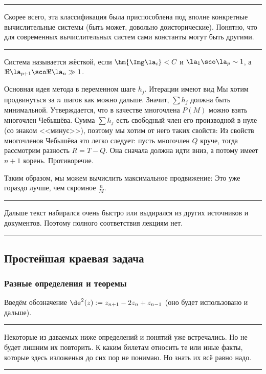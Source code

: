 \documentclass[a4paper]{article}
\newenvironment{petit}{\medskip\hrule\smallskip\footnotesize}{\par\smallskip\hrule\medskip}
\begin{document}
\begin{petit}
Скорее всего, эта классификация была приспособлена под вполне конкретные вычислительные системы (быть может,
довольно доисторические). Понятно, что для современных вычислительных систем сами константы могут быть другими.
\end{petit}

\begin{df}
Система называется жёсткой, если $\hm{\Img \la_i} < C$ и $\la_1\sco\la_p \sim 1$, а $\Re \la_{p+1}\sco \Re \la_n \gg 1$.
\end{df}

Основная идея метода в переменном шаге $h_j$.
Итерации имеют вид
Мы хотим продвинуться за $n$ шагов как можно дальше. Значит, $\sum h_j$ должна быть минимальной.
Утверждается, что в качестве многочлена $P(M)$ можно взять многочлен Чебышёва. Сумма $\sum h_j$ есть свободный член его
производной в нуле (со знаком <<минус>>), поэтому мы хотим от него таких свойств:
Из свойств многочленов Чебышёва это легко следует: пусть многочлен $Q$ круче, тогда рассмотрим разность $R = T-Q$.
Она сначала должна идти вниз, а потому имеет $n+1$ корень. Противоречие.

Таким образом, мы можем вычислить максимальное продвижение:
Это уже гораздо лучше, чем скромное $\frac nM$.

\begin{petit}
Дальше текст набирался очень быстро или выдирался из других источников и документов.
Поэтому полного соответствия лекциям нет.
\end{petit}

\subsection{Простейшая краевая задача}

\subsubsection{Разные определения и теоремы}

Введём обозначение $\de^2 (z) := z_{n+1}-2z_n + z_{n-1}$ (оно будет использовано и дальше).

\begin{petit}
Некоторые из даваемых ниже определений и понятий уже встречались. Но не будет лишним их повторить.
К каким билетам относить те или иные факты, которые здесь изложены\т я до сих пор не понимаю. Но знать их всё равно надо.
\end{petit}
\end{document}
